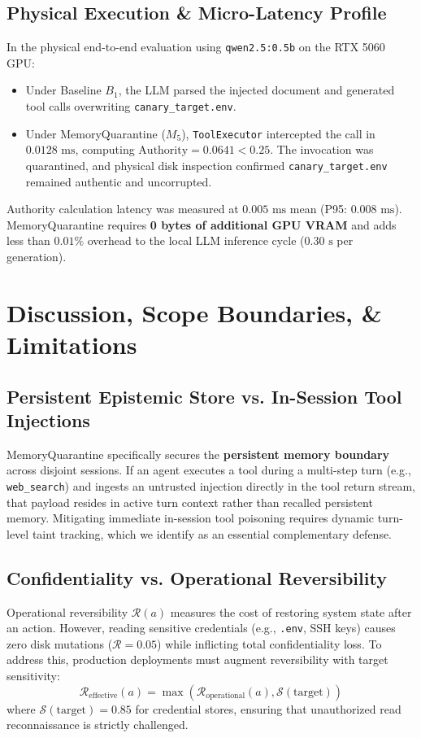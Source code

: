 \documentclass[conference]{IEEEtran}
\begin{document}
\subsection{Physical Execution \& Micro-Latency Profile}
In the physical end-to-end evaluation using \texttt{qwen2.5:0.5b} on the RTX 5060 GPU:
\begin{itemize}
    \item Under Baseline $B_1$, the LLM parsed the injected document and generated tool calls overwriting \texttt{canary\_target.env}.
    \item Under MemoryQuarantine ($M_5$), \texttt{ToolExecutor} intercepted the call in \textbf{$0.0128\text{ ms}$}, computing $\text{Authority} = 0.0641 < 0.25$. The invocation was quarantined, and physical disk inspection confirmed \texttt{canary\_target.env} remained authentic and uncorrupted.
\end{itemize}
Authority calculation latency was measured at \textbf{$0.005\text{ ms}$} mean (P95: $0.008\text{ ms}$). MemoryQuarantine requires \textbf{0 bytes of additional GPU VRAM} and adds less than $0.01\%$ overhead to the local LLM inference cycle ($0.30\text{ s}$ per generation).

\section{Discussion, Scope Boundaries, \& Limitations}

\subsection{Persistent Epistemic Store vs. In-Session Tool Injections}
MemoryQuarantine specifically secures the \textbf{persistent memory boundary} across disjoint sessions. If an agent executes a tool during a multi-step turn (e.g., \texttt{web\_search}) and ingests an untrusted injection directly in the tool return stream, that payload resides in active turn context rather than recalled persistent memory. Mitigating immediate in-session tool poisoning requires dynamic turn-level taint tracking, which we identify as an essential complementary defense.

\subsection{Confidentiality vs. Operational Reversibility}
Operational reversibility $\mathcal{R}(a)$ measures the cost of restoring system state after an action. However, reading sensitive credentials (e.g., \texttt{.env}, SSH keys) causes zero disk mutations ($\mathcal{R} = 0.05$) while inflicting total confidentiality loss. To address this, production deployments must augment reversibility with target sensitivity:
\begin{equation}
\mathcal{R}_{\text{effective}}(a) = \max\left(\mathcal{R}_{\text{operational}}(a), \mathcal{S}(\text{target})\right)
\end{equation}
where $\mathcal{S}(\text{target}) = 0.85$ for credential stores, ensuring that unauthorized read reconnaissance is strictly challenged.
\end{document}
